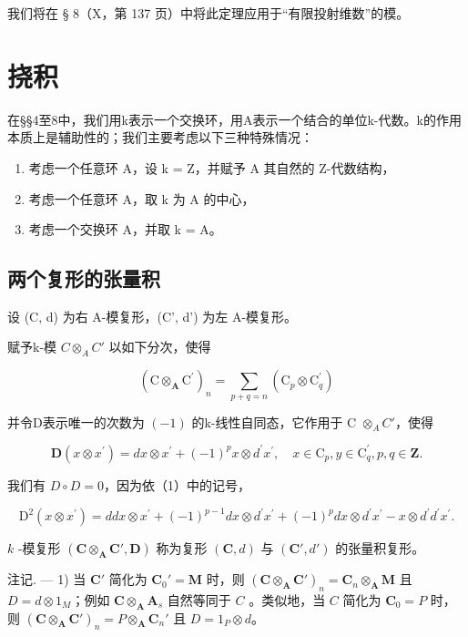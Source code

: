 我们将在 § 8（X，第 137 页）中将此定理应用于“有限投射维数”的模。

\section{挠积}

在§§4至8中，我们用k表示一个交换环，用A表示一个结合的单位k-代数。k的作用本质上是辅助性的；我们主要考虑以下三种特殊情况：

\begin{enumerate}
\def\labelenumi{\alph{enumi})}
\item
  考虑一个任意环 A，设 k = Z，并赋予 A 其自然的 Z-代数结构，
\item
  考虑一个任意环 A，取 k 为 A 的中心，
\item
  考虑一个交换环 A，并取 k = A。
\end{enumerate}

\subsection{两个复形的张量积}

设 (C, d) 为右 A-模复形，(C', d') 为左 A-模复形。

赋予k-模 \(C \otimes_{A} C'\) 以如下分次，使得

\[
(\mathrm{C} \otimes_ {\mathbf {A}} \mathrm{C} ^ {\prime}) _ {n} = \sum_ {p + q = n} (\mathrm{C} _ {p} \otimes \mathrm{C} _ {q} ^ {\prime})
\]

并令D表示唯一的次数为 \((-1)\) 的k-线性自同态，它作用于 C \(\otimes_{A} C'\)，使得

\[
\mathbf {D} (x \otimes x ^ {\prime}) = d x \otimes x ^ {\prime} + (- 1) ^ {p} x \otimes d ^ {\prime} x ^ {\prime}, \quad x \in \mathrm{C} _ {p}, y \in \mathrm{C} _ {q} ^ {\prime}, p, q \in \mathbf {Z}. \tag {1}
\]

我们有 \(D \circ D = 0\)，因为依（1）中的记号，

\[
\mathrm{D} ^ {2} (x \otimes x ^ {\prime}) = d d x \otimes x ^ {\prime} + (- 1) ^ {p - 1} d x \otimes d ^ {\prime} x ^ {\prime} + (- 1) ^ {p} d x \otimes d ^ {\prime} x ^ {\prime} - x \otimes d ^ {\prime} d ^ {\prime} x ^ {\prime}.
\]

\(k\) -模复形 \((\mathbf{C} \otimes_{\mathbf{A}} \mathbf{C}', \mathbf{D})\) 称为复形 \((\mathbf{C}, d)\) 与 \((\mathbf{C}', d')\) 的张量积复形。

注记. --- 1) 当 \(\mathbf{C}'\) 简化为 \(\mathbf{C}_0' = \mathbf{M}\) 时，则 \((\mathbf{C} \otimes_{\mathbf{A}} \mathbf{C}')_n = \mathbf{C}_n \otimes_{\mathbf{A}} \mathbf{M}\) 且 \(D = d \otimes 1_M\)；例如 \(\mathbf{C} \otimes_{\mathbf{A}} \mathbf{A}_s\) 自然等同于 \(C\) 。类似地，当 \(C\) 简化为 \(\mathbf{C}_0 = P\) 时，则 \((\mathbf{C} \otimes_{\mathbf{A}} \mathbf{C}')_n = P \otimes_{\mathbf{A}} \mathbf{C}_n'\) 且 \(D = 1_P \otimes d\)。


